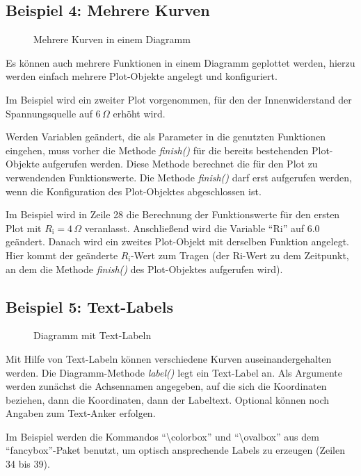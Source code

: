 \documentclass[ngerman,origlongtable]{scrartcl}
\newcommand{\includepgfimage}[2]{%
\begin{figure}%
{\centering%
\caption{#2}\label{fig:#1}%
}%
\end{figure}%
}
\begin{document}
\subsection[Mehrere Kurven]{Beispiel 4: Mehrere Kurven}
\includepgfimage{../examples/test004a}{Mehrere Kurven in einem Diagramm}
Es können auch mehrere Funktionen in einem Diagramm geplottet werden,
hierzu werden einfach mehrere Plot-Objekte angelegt und konfiguriert.

Im Beispiel wird ein zweiter Plot vorgenommen, für den der Innenwiderstand
der Spannungsquelle auf 6\,\(\Omega\) erhöht wird.

Werden Variablen geändert, die als Parameter in die genutzten Funktionen
eingehen, muss vorher die Methode \textit{finish()\/} für die bereits
bestehenden Plot-Objekte aufgerufen werden. Diese Methode berechnet die
für den Plot zu verwendenden Funktionswerte.
Die Methode \textit{finish()\/} darf erst aufgerufen werden, wenn die
Konfiguration des Plot-Objektes abgeschlossen ist.

Im Beispiel wird in Zeile 28 die Berechnung der Funktionswerte für den
ersten Plot mit \(R_{\text{i}}=4\,\Omega\) veranlasst.
Anschließend wird die Variable "`\textdollar{}Ri"' auf 6.0 geändert.
Danach wird ein zweites Plot-Objekt mit derselben Funktion angelegt.
Hier kommt der geänderte \(R_{\text{i}}\)-Wert zum Tragen
(der \textdollar{}Ri-Wert zu dem Zeitpunkt, an dem die Methode
\textit{finish()\/} des Plot-Objektes aufgerufen wird).


\clearpage
\subsection[Text-Labels]{Beispiel 5: Text-Labels}
\includepgfimage{../examples/test005a}{Diagramm mit Text-Labeln}
Mit Hilfe von Text-Labeln können verschiedene Kurven auseinandergehalten
werden.
Die Diagramm-Methode \textit{label()\/} legt ein Text-Label an.
Als Argumente werden zunächst die Achsennamen angegeben, auf die sich
die Koordinaten beziehen, dann die Koordinaten, dann der Labeltext.
Optional können noch Angaben zum Text-Anker erfolgen.

Im Beispiel werden die Kommandos
"`\textbackslash{}colorbox"' und "`\textbackslash{}ovalbox"' aus dem
"`fancybox"'-Paket benutzt, um optisch ansprechende Labels zu erzeugen
(Zeilen 34 bis 39).

\clearpage
\end{document}
